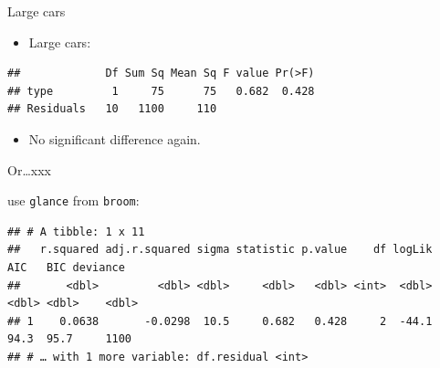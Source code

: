 \documentclass[ignorenonframetext,]{beamer}
\newenvironment{Shaded}{\begin{snugshade}}{\end{snugshade}}
\newcommand{\DataTypeTok}[1]{\textcolor[rgb]{0.13,0.29,0.53}{#1}}
\newcommand{\KeywordTok}[1]{\textcolor[rgb]{0.13,0.29,0.53}{\textbf{#1}}}
\newcommand{\NormalTok}[1]{#1}
\newcommand{\OperatorTok}[1]{\textcolor[rgb]{0.81,0.36,0.00}{\textbf{#1}}}
\newcommand{\StringTok}[1]{\textcolor[rgb]{0.31,0.60,0.02}{#1}}
\providecommand{\tightlist}{%
  \setlength{\itemsep}{0pt}\setlength{\parskip}{0pt}}
\begin{document}
\begin{frame}[fragile]{Large cars}
\protect\hypertarget{large-cars}{}

\begin{itemize}
\tightlist
\item
  Large cars:
\end{itemize}

\begin{Shaded}
\end{Shaded}

\begin{verbatim}
##             Df Sum Sq Mean Sq F value Pr(>F)
## type         1     75      75   0.682  0.428
## Residuals   10   1100     110
\end{verbatim}

\begin{itemize}
\tightlist
\item
  No significant difference again.
\end{itemize}

\end{frame}

\begin{frame}[fragile]{Or\ldots xxx}
\protect\hypertarget{orxxx}{}

use \texttt{glance} from \texttt{broom}:

\small

\begin{Shaded}
\end{Shaded}

\begin{verbatim}
## # A tibble: 1 x 11
##   r.squared adj.r.squared sigma statistic p.value    df logLik   AIC   BIC deviance
##       <dbl>         <dbl> <dbl>     <dbl>   <dbl> <int>  <dbl> <dbl> <dbl>    <dbl>
## 1    0.0638       -0.0298  10.5     0.682   0.428     2  -44.1  94.3  95.7     1100
## # … with 1 more variable: df.residual <int>
\end{verbatim}

\normalsize

\end{frame}
\end{document}
